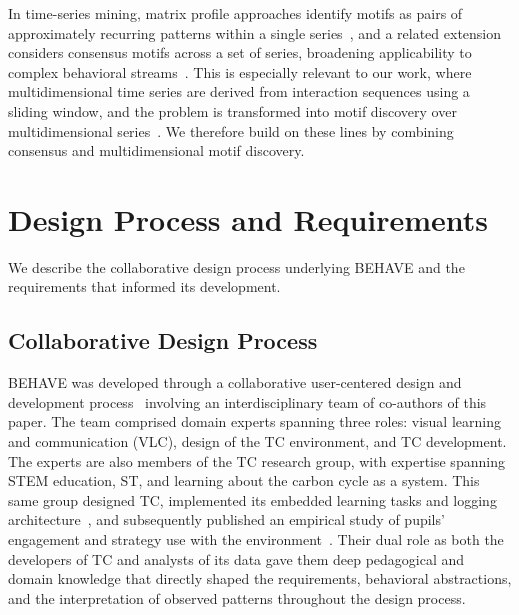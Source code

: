 \documentclass[letterpaper,journal]{IEEEtran}
\begin{document}
In time-series mining, matrix profile approaches identify motifs as pairs of approximately recurring patterns within a single series~\cite{yeh2016matrix, zhu2016matrix}, and a related extension considers consensus motifs across a set of series, broadening applicability to complex behavioral streams~\cite{kamgar2019matrix}.
This is especially relevant to our work, where multidimensional time series are derived from interaction sequences using a sliding window, and the problem is transformed into motif discovery over multidimensional series~\cite{yeh2017matrix}.
We therefore build on these lines by combining consensus and multidimensional motif discovery.





\section{Design Process and Requirements}
\label{sec:design_process}
We describe the collaborative design process underlying \textsc{BEHAVE} and the requirements that informed its development.

\subsection{Collaborative Design Process}
\label{subsec:design_proc}
\textsc{BEHAVE} was developed through a collaborative user-centered design and development process~\cite{christmann2022visualizing} involving an interdisciplinary team of co-authors of this paper.
The team comprised domain experts spanning three roles: visual learning and communication (VLC), design of the TC environment, and TC development.
The experts are also members of the TC research group, with expertise spanning STEM education, ST, and learning about the carbon cycle as a system. This same group designed TC, implemented its embedded learning tasks and logging architecture~\cite{mani2026designing}, and subsequently published an empirical study of pupils' engagement and strategy use with the environment~\cite{host2026pupils}.
Their dual role as both the developers of TC and analysts of its data gave them deep pedagogical and domain knowledge that directly shaped the requirements, behavioral abstractions, and the interpretation of observed patterns throughout the design process.
\end{document}
